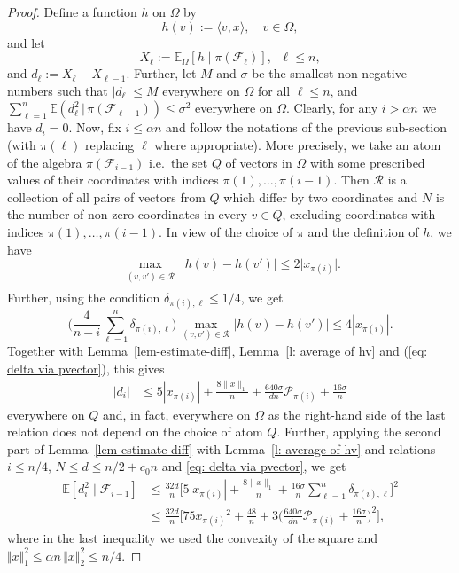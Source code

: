\documentclass[12pt]{article}
\theoremstyle{definition}
\theoremstyle{plain}
\newcommand{\E}{\mathbb{E}}
\def\pvector{{\mathcal P}}
\def\relation{{\mathcal R}}
\begin{document}
\begin{proof}
Define a function $h$ on $\Omega$ by
$$h(v):= \langle v,x\rangle,\quad v\in\Omega,$$
and let
$$X_\ell:=\E_\Omega[h\mid \pi(\mathcal F_\ell)],\;\;\ell\leq n,$$
and $d_\ell:=X_{\ell}-X_{\ell-1}$.
Further, let $M$ and $\sigma$ be the smallest non-negative numbers such that $|d_\ell|\leq M$ everywhere on $\Omega$ for all $\ell\leq n$,
and $\sum_{\ell=1}^n\E(d_\ell^2\,|\,\pi(\mathcal F_{\ell-1}))\leq\sigma^2$ everywhere on $\Omega$.
Clearly, for any $i>\alpha n$ we have $d_i=0$.
Now, fix $i\leq \alpha n$ and follow the notations of the previous sub-section (with $\pi(\ell)$ replacing $\ell$
where appropriate). More precisely, we take an atom of the algebra $\pi(\mathcal F_{i-1})$
i.e.\ the set $Q$ of vectors in $\Omega$ with some prescribed values of their coordinates with indices $\pi(1),\dots,\pi(i-1)$.
Then $\relation$ is a collection of all pairs of vectors from $Q$ which differ by two coordinates
and $N$ is the number of non-zero coordinates in every $v\in Q$, excluding coordinates with indices $\pi(1),\dots,\pi(i-1)$.
In view of the choice of $\pi$ and the definition of $h$, we have
$$
\max\limits_{\substack{(v,v')\in \relation\\ }}\vert h(v)-h(v')\vert \leq 2\vert x_{\pi(i)}\vert.
$$
Further, using the condition $\delta_{\pi(i),\ell}\leq 1/4$, we get
$$\Big(\frac{4}{n-i} \sum_{\ell=1}^n \delta_{\pi(i),\ell}\Big)\, \max_{(v,v')\in \relation} \big\vert h(v)-h(v')\big\vert
\leq 4|x_{\pi(i)}|.$$
Together with Lemma~\ref{lem-estimate-diff}, Lemma~\ref{l: average of hv} and (\ref{eq: delta via pvector}), this gives 
\begin{align*}
\vert d_i\vert &\leq 5|x_{\pi(i)}|+\frac{8\|x\|_1}{n}
+\frac{640\sigma}{dn}\pvector_{\pi(i)}+\frac{16\sigma}{n}
\end{align*}
everywhere on $Q$ and, in fact, everywhere on $\Omega$ as the right-hand side of the last relation does not depend on the choice
of atom $Q$.
Further, applying the second part of Lemma~\ref{lem-estimate-diff} with Lemma~\ref{l: average of hv}
and relations $i\leq n/4$, $N\leq d\leq n/2+c_0n$ and \eqref{eq: delta via pvector}, we get
\begin{align*}
\E [d_i^2\mid\mathcal{F}_{i-1}]
&\leq \frac{32d}{n}
\Big[5|x_{\pi(i)}|+\frac{8\|x\|_1}{n}
+\frac{16\sigma}{n} \sum_{\ell=1}^n \delta_{\pi(i),\ell}\Big]^2\\
&\leq \frac{32d}{n}
\Big[75{x_{\pi(i)}}^2+\frac{48}{n}+3\Big(\frac{640\sigma}{dn}\pvector_{\pi(i)}+\frac{16\sigma}{n}\Big)^2\Big],
\end{align*}
where in the last inequality we used the convexity of the square and $\Vert x\Vert_1^2\leq \alpha n\, \Vert x\Vert_2^2\leq n/4$. 

\end{proof}
\end{document}
